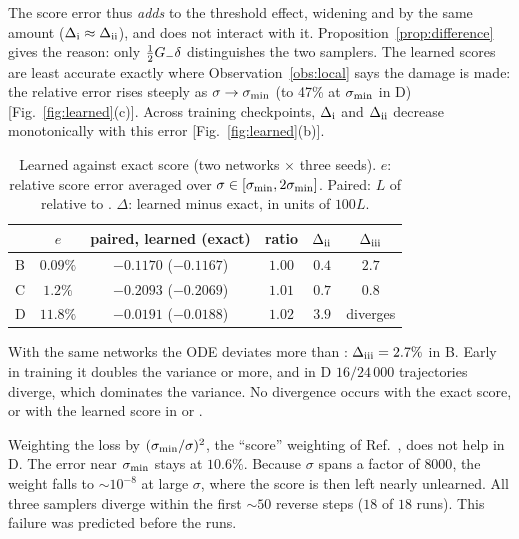 The score error thus \emph{adds} to the threshold effect, widening \Sa{} and \Sb{} by the same amount ($\Delta_{\rm i}\approx\Delta_{\rm ii}$), and does not interact with it.
Proposition~\ref{prop:difference} gives the reason: only $\tfrac12G_{-}\delta$ distinguishes the two samplers.
The learned scores are least accurate exactly where Observation~\ref{obs:local} says the damage is made: the relative error rises steeply as $\sigma\to\sigma_{\min}$ (to 47\% at $\sigma_{\min}$ in D) [Fig.~\ref{fig:learned}(c)].
Across training checkpoints, $\Delta_{\rm i}$ and $\Delta_{\rm ii}$ decrease monotonically with this error [Fig.~\ref{fig:learned}(b)].

\begin{table}[t]
\caption{Learned against exact score (two networks $\times$ three seeds). $e$: relative score error averaged over $\sigma\in[\sigma_{\min},2\sigma_{\min}]$. Paired: $L$ of \Sa{} relative to \Sb{}. $\Delta$: learned minus exact, in units of $100L$.}
\label{tab:learned}
\begin{ruledtabular}
\begin{tabular}{lccccc}
 & $e$ & paired, learned (exact) & ratio & $\Delta_{\rm ii}$ & $\Delta_{\rm iii}$ \\
\hline
B & $0.09\%$ & $-0.1170$ ($-0.1167$) & $1.00$ & $0.4$ & $2.7$ \\
C & $1.2\%$ & $-0.2093$ ($-0.2069$) & $1.01$ & $0.7$ & $0.8$ \\
D & $11.8\%$ & $-0.0191$ ($-0.0188$) & $1.02$ & $3.9$ & diverges \\
\end{tabular}
\end{ruledtabular}
\end{table}

\begin{observation}
\label{obs:ode}
With the same networks the ODE deviates more than \Sb{}: $\Delta_{\rm iii}=2.7\%$ in B.
Early in training it doubles the variance or more, and in D $16/24\,000$ trajectories diverge, which dominates the variance.
No divergence occurs with the exact score, or with the learned score in \Sa{} or \Sb{}.
\end{observation}

\begin{observation}
\label{obs:weighting}
Weighting the loss by $(\sigma_{\min}/\sigma)^2$, the ``score'' weighting of Ref.~\cite{namba2026learned}, does not help in D.
The error near $\sigma_{\min}$ stays at $10.6\%$.
Because $\sigma$ spans a factor of $8000$, the weight falls to $\sim10^{-8}$ at large $\sigma$, where the score is then left nearly unlearned.
All three samplers diverge within the first $\sim50$ reverse steps ($18$ of $18$ runs).
This failure was predicted before the runs.
\end{observation}

